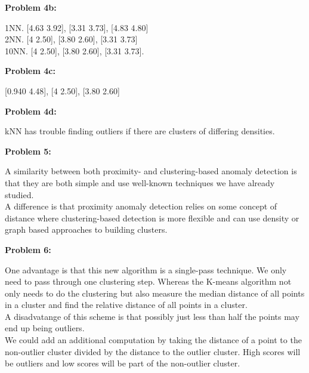 \documentclass[11pt]{article}
\numberwithin{equation}{section}  %
\begin{document}
\noindent\textbf{Problem 4b: }

1NN. [4.63 3.92], [3.31 3.73], [4.83 4.80]\\
2NN. [4 2.50], [3.80 2.60], [3.31 3.73]\\
10NN. [4 2.50], [3.80 2.60], [3.31 3.73].
\vspace*{0.25in}

\noindent\textbf{Problem 4c: }

[0.940 4.48], [4 2.50], [3.80 2.60]
\vspace*{0.25in}

\noindent\textbf{Problem 4d: }

kNN has trouble finding outliers if there are clusters of differing densities.
\vspace*{0.25in}

\noindent\textbf{Problem 5: }

A similarity between both proximity- and clustering-based anomaly detection is that they are both simple and use well-known techniques we have already studied.\\

A difference is that proximity anomaly detection relies on some concept of distance where clustering-based detection is more flexible and can use density or graph based approaches to building clusters.
\vspace*{0.25in}

\noindent\textbf{Problem 6: }

One advantage is that this new algorithm is a single-pass technique. We only need to pass through one clustering step. Whereas the K-means algorithm not only needs to do the clustering but also measure the median distance of all points in a cluster and find the relative distance of all points in a cluster.\\

A disadvatange of this scheme is that possibly just less than half the points may end up being outliers.\\

We could add an additional computation by taking the distance of a point to the non-outlier cluster divided by the distance to the outlier cluster. High scores will be outliers and low scores will be part of the non-outlier cluster.
\vspace*{0.25in}
\end{document}
